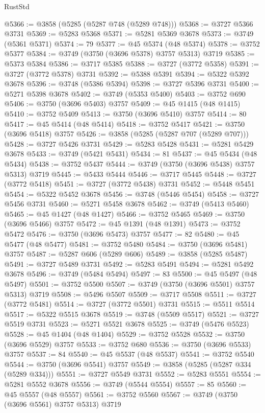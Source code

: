 \begin{lexlean}{RustStd}
\begin{coremodule}
@5366 := @3858 (@5285 (@5287 @748 (@5289 @748)))
@5368 := @3727 @5366 @3731
@5369 := @5283 @5368
@5371 := @5281 @5369 @3678
@5373 := @3749 (@5361 @5371)
@5374 := 79
@5377 := @45 @5374 (@48 @5374)
@5378 := @3752 @5377
@5384 := @3749 (@3750 (@3696 @5378) @3757 @5313) @3719
@5385 := @5373 @5384
@5386 := @3717 @5385
@5388 := @3727 (@3772 @5358)
@5391 := @3727 (@3772 @5378) @3731
@5392 := @5388 @5391
@5394 := @5322 @5392 @3678
@5396 := @3748 (@5386 @5394)
@5398 := @3727 @5396 @3731
@5400 := @5271 @5398 @3678
@5402 := @3749 (@5353 @5400)
@5403 := @3752 @690
@5406 := @3750 (@3696 @5403) @3757
@5409 := @45 @1415 (@48 @1415)
@5410 := @3752 @5409
@5413 := @3750 (@3696 @5410) @3757
@5414 := 80
@5417 := @45 @5414 (@48 @5414)
@5418 := @3752 @5417
@5421 := @3750 (@3696 @5418) @3757
@5426 := @3858 (@5285 (@5287 @707 (@5289 @707)))
@5428 := @3727 @5426 @3731
@5429 := @5283 @5428
@5431 := @5281 @5429 @3678
@5433 := @3749 (@5421 @5431)
@5434 := 81
@5437 := @45 @5434 (@48 @5434)
@5438 := @3752 @5437
@5444 := @3749 (@3750 (@3696 @5438) @3757 @5313) @3719
@5445 := @5433 @5444
@5446 := @3717 @5445
@5448 := @3727 (@3772 @5418)
@5451 := @3727 (@3772 @5438) @3731
@5452 := @5448 @5451
@5454 := @5322 @5452 @3678
@5456 := @3748 (@5446 @5454)
@5458 := @3727 @5456 @3731
@5460 := @5271 @5458 @3678
@5462 := @3749 (@5413 @5460)
@5465 := @45 @1427 (@48 @1427)
@5466 := @3752 @5465
@5469 := @3750 (@3696 @5466) @3757
@5472 := @45 @1391 (@48 @1391)
@5473 := @3752 @5472
@5476 := @3750 (@3696 @5473) @3757
@5477 := 82
@5480 := @45 @5477 (@48 @5477)
@5481 := @3752 @5480
@5484 := @3750 (@3696 @5481) @3757
@5487 := @5287 @606 (@5289 @606)
@5489 := @3858 (@5285 @5487)
@5491 := @3727 @5489 @3731
@5492 := @5283 @5491
@5494 := @5281 @5492 @3678
@5496 := @3749 (@5484 @5494)
@5497 := 83
@5500 := @45 @5497 (@48 @5497)
@5501 := @3752 @5500
@5507 := @3749 (@3750 (@3696 @5501) @3757 @5313) @3719
@5508 := @5496 @5507
@5509 := @3717 @5508
@5511 := @3727 (@3772 @5481)
@5514 := @3727 (@3772 @5501) @3731
@5515 := @5511 @5514
@5517 := @5322 @5515 @3678
@5519 := @3748 (@5509 @5517)
@5521 := @3727 @5519 @3731
@5523 := @5271 @5521 @3678
@5525 := @3749 (@5476 @5523)
@5528 := @45 @1404 (@48 @1404)
@5529 := @3752 @5528
@5532 := @3750 (@3696 @5529) @3757
@5533 := @3752 @680
@5536 := @3750 (@3696 @5533) @3757
@5537 := 84
@5540 := @45 @5537 (@48 @5537)
@5541 := @3752 @5540
@5544 := @3750 (@3696 @5541) @3757
@5549 := @3858 (@5285 (@5287 @334 (@5289 @334)))
@5551 := @3727 @5549 @3731
@5552 := @5283 @5551
@5554 := @5281 @5552 @3678
@5556 := @3749 (@5544 @5554)
@5557 := 85
@5560 := @45 @5557 (@48 @5557)
@5561 := @3752 @5560
@5567 := @3749 (@3750 (@3696 @5561) @3757 @5313) @3719

\end{coremodule}
\end{lexlean}
